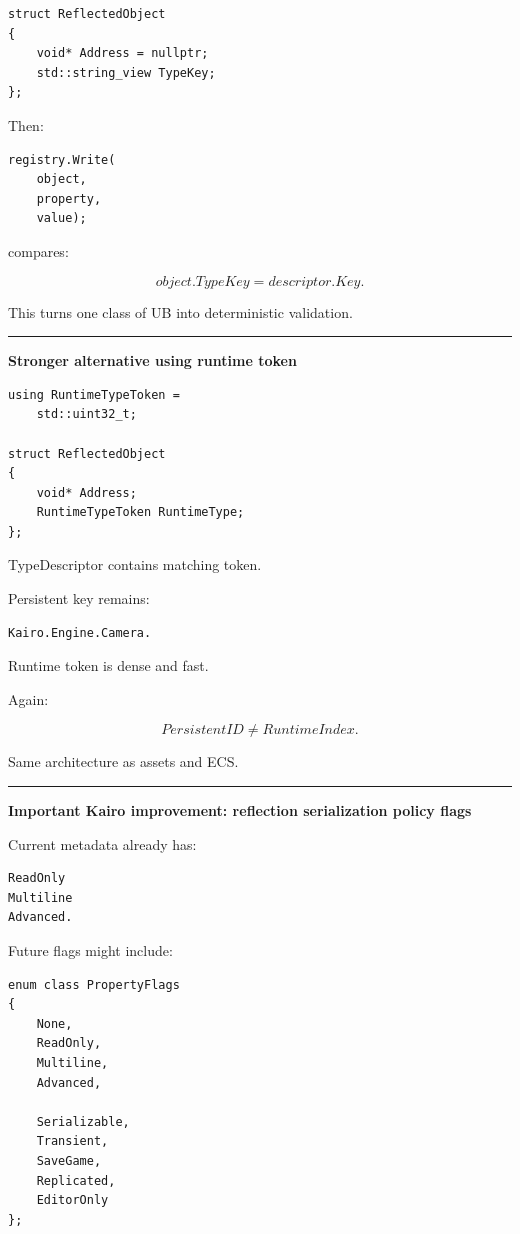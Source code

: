 \begin{verbatim}
struct ReflectedObject
{
    void* Address = nullptr;
    std::string_view TypeKey;
};
\end{verbatim}

Then:

\begin{verbatim}
registry.Write(
    object,
    property,
    value);
\end{verbatim}

compares:

\[
object.TypeKey=
descriptor.Key.
\]

This turns one class of UB into deterministic validation.

\begin{center}\rule{0.5\linewidth}{0.5pt}\end{center}

\textbf{Stronger alternative using runtime token}

\begin{verbatim}
using RuntimeTypeToken =
    std::uint32_t;

struct ReflectedObject
{
    void* Address;
    RuntimeTypeToken RuntimeType;
};
\end{verbatim}

TypeDescriptor contains matching token.

Persistent key remains:

\begin{verbatim}
Kairo.Engine.Camera.
\end{verbatim}

Runtime token is dense and fast.

Again:

\[
PersistentID
\neq
RuntimeIndex.
\]

Same architecture as assets and ECS.

\begin{center}\rule{0.5\linewidth}{0.5pt}\end{center}

\textbf{Important Kairo improvement: reflection serialization policy flags}

Current metadata already has:

\begin{verbatim}
ReadOnly
Multiline
Advanced.
\end{verbatim}

Future flags might include:

\begin{verbatim}
enum class PropertyFlags
{
    None,
    ReadOnly,
    Multiline,
    Advanced,

    Serializable,
    Transient,
    SaveGame,
    Replicated,
    EditorOnly
};
\end{verbatim}

